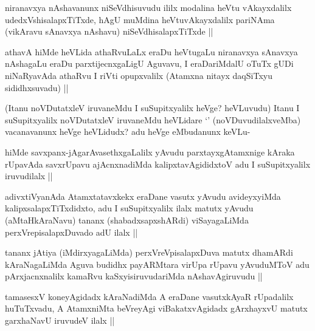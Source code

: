 \begin{artha}
niranavxya nAshavanunx niSeVdhisuvudu ililx modalina heVtu vAkayxdalilx udedxVshisalapxTiTxde, hAgU muMdina heVtuvAkayxdalilx pariNAma (vikAravu sAnavxya nAshavu) niSeVdhisalapxTiTxde ||
\end{artha}


\begin{artha}
athavA hiMde heVLida athaRvuLaLx eraDu heVtugaLu niranavxya sAnavxya nAshagaLu eraDu parxtijecnxgaLigU Aguvavu, I eraDariMdalU oTuTx gUDi niNaRyavAda athaRvu I riVti opupxvalilx (Atamxna nitayx daqSiTxyu sididhxsuvadu) ||
\end{artha}

\begin{artha}
(Itanu noVDutatxleV iruvaneMdu I suSupitxyalilx heVge? heVLuvudu) Itanu I suSupitxyalilx noVDutatxleV iruvaneMdu heVLidare `\stext' (noVDuvudilalxveMba) vacanavanunx heVge heVLidudx? adu heVge eMbudanunx keVLu-
\end{artha}


\begin{artha}
hiMde savxpanx-jAgarAvasethxgaLalilx yAvudu parxtayxgAtamxnige kAraka rUpavAda savxrUpavu ajAcnxnadiMda kalipxtavAgididxtoV adu I suSupitxyalilx iruvudilalx ||
\end{artha}


\begin{artha}
adivxtiVyanAda Atamxtatavxkekx eraDane vasutx yAvudu avideyxyiMda kalipxsalapxTiTxdidxto, adu I suSupitxyalilx ilalx matutx yAvudu (aMtaHkAraNavu) tananx (shabadxsapxshARdi) viSayagaLiMda perxVrepisalapxDuvado adU ilalx ||
\end{artha}

\begin{artha}
tananx jAtiya (iMdirxyagaLiMda) perxVreVpisalapxDuva matutx dhamARdi kAraNagaLiMda Aguva budidhx payARMtara virUpa rUpavu yAvuduMToV adu pArxjacnxnalilx kamaRvu kaSxyisiruvudariMda nAshavAgiruvudu ||
\end{artha}

\begin{artha}
tamasesxV koneyAgidadx kAraNadiMda A eraDane vasutxkAyaR rUpadalilx huTuTxvadu, A AtamxniMta beVreyAgi viBakatxvAgidadx gArxhayxvU matutx garxhaNavU iruvudeV ilalx ||
\end{artha}

